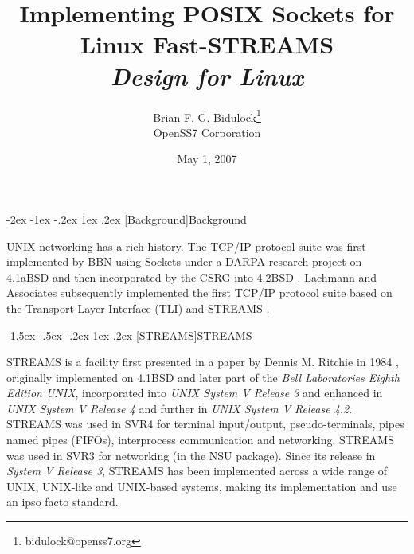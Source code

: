 \documentclass[letterpaper,final,notitlepage,twocolumn,10pt,twoside]{article}
\makeatletter
\renewcommand\section{\@startsection {section}{1}{\z@}%
                                   {-2ex \@plus -1ex \@minus -.2ex}%
                                   {1ex \@plus .2ex}%
                                   {\normalfont\large\bfseries}}
\renewcommand\subsection{\@startsection{subsection}{2}{\z@}%
                                     {-1.5ex \@plus -.5ex \@minus -.2ex}%
                                     {1ex \@plus .2ex}%
                                     {\normalfont\normalsize\bfseries}}
\makeatother
\begin{document}

\title{Implementing POSIX Sockets for Linux Fast-STREAMS\\[0.5ex]
	{\large \textsl{Design for Linux}}}
\author{Brian F. G. Bidulock\thanks{bidulock@openss7.org}\\
	OpenSS7 Corporation}
\date{May 1, 2007}
\maketitle

\begin{abstract}
\end{abstract}


\section[Background]{Background}

UNIX networking has a rich history.  The TCP/IP protocol suite was first
implemented by BBN using Sockets under a DARPA research project on 4.1aBSD and
then incorporated by the CSRG into 4.2BSD \cite[]{bsd}.  Lachmann and
Associates subsequently implemented the first TCP/IP protocol suite based on
the Transport Layer Interface (TLI) \cite[]{tli} and STREAMS \cite[]{magic}.

\subsection[STREAMS]{STREAMS}

STREAMS is a facility first presented in a paper by Dennis M. Ritchie in 1984
\cite{Ritchie84}, originally implemented on 4.1BSD and later part of the
\textsl{Bell Laboratories Eighth Edition UNIX}, incorporated into \textsl{UNIX
System V Release 3} and enhanced in \textsl{UNIX System V Release 4} and
further in \textsl{UNIX System V Release 4.2}.  STREAMS was used in SVR4 for
terminal input/output, pseudo-terminals, pipes named pipes (FIFOs),
interprocess communication and networking.  STREAMS was used in SVR3 for
networking (in the NSU package).  Since its release in \textsl{System V
Release 3}, STREAMS has been implemented across a wide range of UNIX,
UNIX-like and UNIX-based systems, making its implementation and use an ipso
facto standard.
\end{document}
